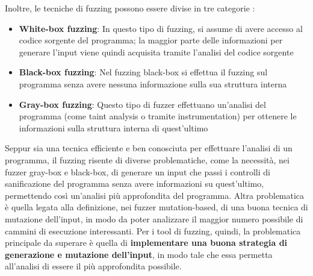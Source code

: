 \documentclass[../main.tex]{subfiles}
\begin{document}
Inoltre, le tecniche di fuzzing possono essere divise in tre categorie \cite{Fuzzing_survey}:
\begin{itemize}
    \item \textbf{White-box fuzzing}: In questo tipo di fuzzing, si assume di avere accesso al codice sorgente del programma; la maggior parte delle informazioni per generare l'input viene quindi acquisita tramite l'analisi del codice sorgente
    \item \textbf{Black-box fuzzing}: Nel fuzzing black-box si effettua il fuzzing sul programma senza avere nessuna informazione sulla sua struttura interna
    \item \textbf{Gray-box fuzzing}: Questo tipo di fuzzer effettuano un'analisi del programma (come taint analysis o tramite instrumentation) per ottenere le informazioni sulla struttura interna di quest'ultimo
\end{itemize}
Seppur sia una tecnica efficiente e ben conosciuta per effettuare l'analisi di un programma, il fuzzing risente di diverse problematiche, come la necessità, nei fuzzer gray-box e black-box, di generare un input che passi i controlli di sanificazione del programma senza avere
informazioni su quest'ultimo, permettendo così un'analisi più approfondita del programma. Altra problematica è quella legata alla definizione, nei fuzzer mutation-based, di una buona tecnica di mutazione dell'input, in modo da poter analizzare il maggior numero
possibile di cammini di esecuzione interessanti. Per i tool di fuzzing, quindi, la problematica principale da superare è quella di \textbf{implementare una buona strategia di generazione e mutazione dell'input}, in modo tale che essa permetta all'analisi di essere il più approfondita possibile.
\end{document}
